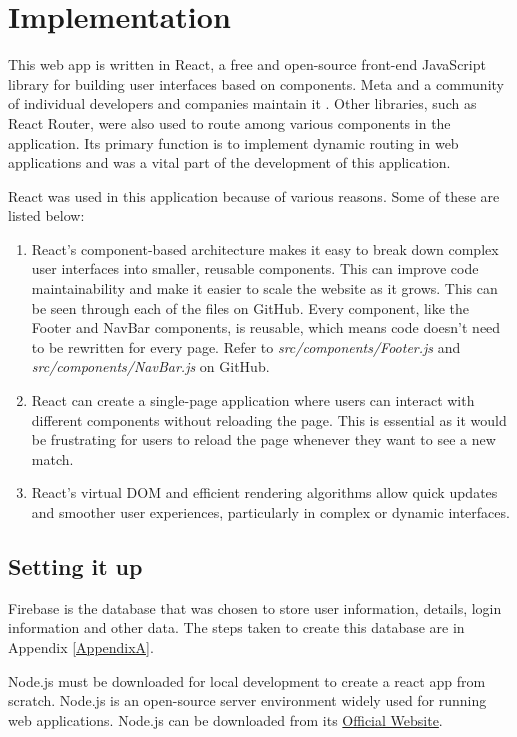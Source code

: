\chapter{Implementation}
This web app is written in React, a free and open-source front-end JavaScript library for building user interfaces based on components. Meta and a community of individual developers and companies maintain it \parencite{Reference31}. Other libraries, such as React Router, were also used to route among various components in the application. Its primary function is to implement dynamic routing in web applications and was a vital part of the development of this application. 

React was used in this application because of various reasons. Some of these are listed below: 

\begin{enumerate}
    \item React's component-based architecture makes it easy to break down complex user interfaces into smaller, reusable components. This can improve code maintainability and make it easier to scale the website as it grows. This can be seen through each of the files on GitHub. Every component, like the Footer and NavBar components, is reusable, which means code doesn't need to be rewritten for every page. Refer to \textit{src/components/Footer.js} and \textit{src/components/NavBar.js} on GitHub.
    \item React can create a single-page application where users can interact with different components without reloading the page. This is essential as it would be frustrating for users to reload the page whenever they want to see a new match.
    \item React's virtual DOM and efficient rendering algorithms allow quick updates and smoother user experiences, particularly in complex or dynamic interfaces.
\end{enumerate}

\section{Setting it up}
Firebase is the database that was chosen to store user information, details, login information and other data. The steps taken to create this database are in Appendix \ref{AppendixA}. 

Node.js must be downloaded for local development to create a react app from scratch. Node.js is an open-source server environment widely used for running web applications. Node.js can be downloaded from its \href{https://nodejs.org/en}{Official Website}. 

